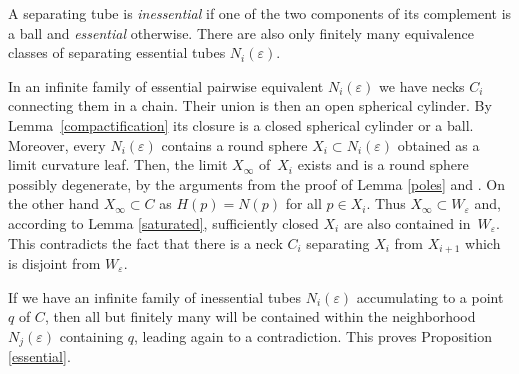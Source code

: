 \documentclass[10pt]{amsart}
\theoremstyle{definition}
\theoremstyle{remark}
\numberwithin{equation}{section}
\begin{document}
A separating tube is \emph{inessential} if one of the two
components of its complement is a ball and \emph{essential} otherwise.
There are also only finitely many equivalence classes of separating
essential tubes $N_i(\varepsilon)$.

In an infinite family of essential pairwise equivalent $N_i(\varepsilon)$ we have necks $C_i$
connecting them in a chain. Their union is then an open spherical cylinder.
By Lemma~\ref{compactification} its closure is a closed
spherical cylinder or a ball. Moreover, every $N_i(\varepsilon)$ contains
a round sphere $X_i\subset N_i(\varepsilon)$ obtained as a limit
curvature leaf. Then, the limit $X_{\infty}$ of~$X_i$ exists and is a
round sphere possibly degenerate, by the arguments from the proof of Lemma \ref{poles} and \cite{DDM}. On the
other hand $X_{\infty}\subset C$ as $H(p)=N(p)$ for all $p\in X_i$.
Thus $X_{\infty}\subset W_{\varepsilon}$ and, according to Lemma \ref{saturated},
sufficiently closed $X_i$ are also contained in~$W_{\varepsilon}$. This
contradicts the fact that there is a neck $C_i$ separating $X_i$
from $X_{i+1}$ which is disjoint from $W_{\varepsilon}$.

If we have an infinite family of inessential tubes $N_i(\varepsilon)$ accumulating to a point~$q$ of $C$, then
all but finitely many will be contained within the neighborhood $N_j(\varepsilon)$ containing $q$, leading again to a contradiction.
This proves Proposition \ref{essential}.
\end{document}
